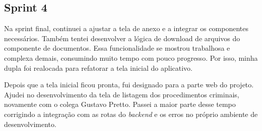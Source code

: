 \subsection{Sprint 4}

Na sprint final, continuei a ajustar a tela de anexo e a integrar os
componentes necessários. Também tentei desenvolver a lógica de download de
arquivos do componente de documentos. Essa funcionalidade se mostrou
trabalhosa e complexa demais, consumindo muito tempo com pouco progresso. Por
isso, minha dupla foi realocada para refatorar a tela inicial do aplicativo.

Depois que a tela inicial ficou pronta, fui designado para a parte web do
projeto. Ajudei no desenvolvimento da tela de listagem dos procedimentos
criminais, novamente com o colega Gustavo Pretto. Passei a maior parte desse
tempo corrigindo a integração com as rotas do \textit{backend} e os erros no
próprio ambiente de desenvolvimento.
\medskip

\noindent{}
